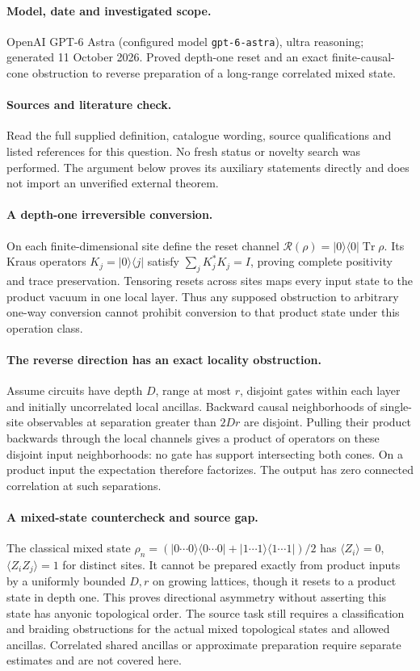 \documentclass[11pt]{article}
\begin{document}
\paragraph{Model, date and investigated scope.}
OpenAI GPT-6 Astra (configured model \texttt{gpt-6-astra}), ultra reasoning; generated 11 October 2026. Proved depth-one reset and an exact finite-causal-cone obstruction to reverse preparation of a long-range correlated mixed state.

\paragraph{Sources and literature check.}
Read the full supplied definition, catalogue wording, source qualifications and listed references for this question. No fresh status or novelty search was performed. The argument below proves its auxiliary statements directly and does not import an unverified external theorem.

\paragraph{A depth-one irreversible conversion.} On each finite-dimensional site define the reset channel \(\mathcal R(\rho)=|0\rangle\langle0|\operatorname{Tr}\rho\). Its Kraus operators \(K_j=|0\rangle\langle j|\) satisfy \(\sum_jK_j^*K_j=I\), proving complete positivity and trace preservation. Tensoring resets across sites maps every input state to the product vacuum in one local layer. Thus any supposed obstruction to arbitrary one-way conversion cannot prohibit conversion to that product state under this operation class.
\paragraph{The reverse direction has an exact locality obstruction.} Assume circuits have depth \(D\), range at most \(r\), disjoint gates within each layer and initially uncorrelated local ancillas. Backward causal neighborhoods of single-site observables at separation greater than \(2Dr\) are disjoint. Pulling their product backwards through the local channels gives a product of operators on these disjoint input neighborhoods: no gate has support intersecting both cones. On a product input the expectation therefore factorizes. The output has zero connected correlation at such separations.
\paragraph{A mixed-state countercheck and source gap.} The classical mixed state \(\rho_n=(|0\cdots0\rangle\langle0\cdots0|+|1\cdots1\rangle\langle1\cdots1|)/2\) has \(\langle Z_i\rangle=0\), \(\langle Z_iZ_j\rangle=1\) for distinct sites. It cannot be prepared exactly from product inputs by a uniformly bounded \(D,r\) on growing lattices, though it resets to a product state in depth one. This proves directional asymmetry without asserting this state has anyonic topological order. The source task still requires a classification and braiding obstructions for the actual mixed topological states and allowed ancillas. Correlated shared ancillas or approximate preparation require separate estimates and are not covered here.
\end{document}
